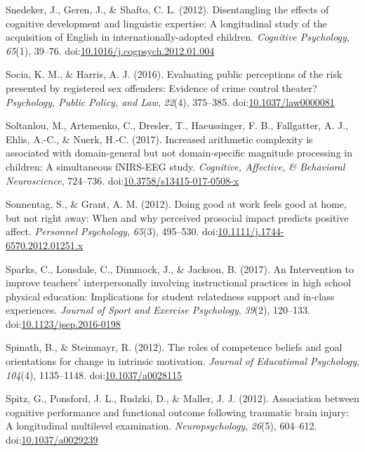 \documentclass[english,man]{apa6}
\theoremstyle{definition}
\theoremstyle{definition}
\theoremstyle{definition}
\theoremstyle{remark}
\begin{document}
\hypertarget{ref-Snedeker2012}{}
Snedeker, J., Geren, J., \& Shafto, C. L. (2012). Disentangling the
effects of cognitive development and linguistic expertise: A
longitudinal study of the acquisition of English in
internationally-adopted children. \emph{Cognitive Psychology},
\emph{65}(1), 39--76.
doi:\href{https://doi.org/10.1016/j.cogpsych.2012.01.004}{10.1016/j.cogpsych.2012.01.004}

\hypertarget{ref-Socia2016}{}
Socia, K. M., \& Harris, A. J. (2016). Evaluating public perceptions of
the risk presented by registered sex offenders: Evidence of crime
control theater? \emph{Psychology, Public Policy, and Law},
\emph{22}(4), 375--385.
doi:\href{https://doi.org/10.1037/law0000081}{10.1037/law0000081}

\hypertarget{ref-Soltanlou2017}{}
Soltanlou, M., Artemenko, C., Dresler, T., Haeussinger, F. B.,
Fallgatter, A. J., Ehlis, A.-C., \& Nuerk, H.-C. (2017). Increased
arithmetic complexity is associated with domain-general but not
domain-specific magnitude processing in children: A simultaneous
fNIRS-EEG study. \emph{Cognitive, Affective, \& Behavioral
Neuroscience}, 724--736.
doi:\href{https://doi.org/10.3758/s13415-017-0508-x}{10.3758/s13415-017-0508-x}

\hypertarget{ref-Sonnentag2012}{}
Sonnentag, S., \& Grant, A. M. (2012). Doing good at work feels good at
home, but not right away: When and why perceived prosocial impact
predicts positive affect. \emph{Personnel Psychology}, \emph{65}(3),
495--530.
doi:\href{https://doi.org/10.1111/j.1744-6570.2012.01251.x}{10.1111/j.1744-6570.2012.01251.x}

\hypertarget{ref-Sparks2017}{}
Sparks, C., Lonsdale, C., Dimmock, J., \& Jackson, B. (2017). An
Intervention to improve teachers' interpersonally involving
instructional practices in high school physical education: Implications
for student relatedness support and in-class experiences. \emph{Journal
of Sport and Exercise Psychology}, \emph{39}(2), 120--133.
doi:\href{https://doi.org/10.1123/jsep.2016-0198}{10.1123/jsep.2016-0198}

\hypertarget{ref-Spinath2012}{}
Spinath, B., \& Steinmayr, R. (2012). The roles of competence beliefs
and goal orientations for change in intrinsic motivation. \emph{Journal
of Educational Psychology}, \emph{104}(4), 1135--1148.
doi:\href{https://doi.org/10.1037/a0028115}{10.1037/a0028115}

\hypertarget{ref-Spitz2012}{}
Spitz, G., Ponsford, J. L., Rudzki, D., \& Maller, J. J. (2012).
Association between cognitive performance and functional outcome
following traumatic brain injury: A longitudinal multilevel examination.
\emph{Neuropsychology}, \emph{26}(5), 604--612.
doi:\href{https://doi.org/10.1037/a0029239}{10.1037/a0029239}
\end{document}
